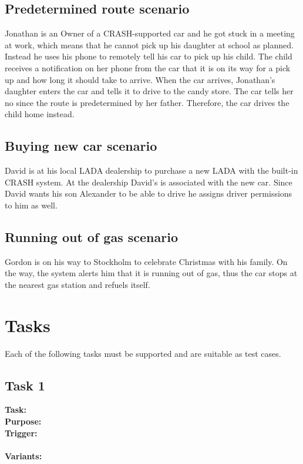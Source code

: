 \documentclass{article}
\begin{document}
\subsection {Predetermined route scenario}
Jonathan is an Owner of a CRASH-supported car and he got stuck in a meeting at work, which means that he cannot pick up his daughter at school as planned. Instead he uses his phone to remotely tell his car to pick up his child. The child receives a notification on her phone from the car that it is on its way for a pick up and how long it should take to arrive. When the car arrives, Jonathan’s daughter enters the car and tells it to drive to the candy store. The car tells her no since the route is predetermined by her father. Therefore, the car drives the child home instead.

\subsection {Buying new car scenario}
David is at his local LADA dealership to purchase a new LADA with the built-in CRASH system. At the dealership David’s is associated with the new car. Since David wants his son Alexander to be able to drive he assigns driver permissions to him as well.

\subsection {Running out of gas scenario}
Gordon is on his way to Stockholm to celebrate Christmas with his family. On the way, the system alerts him that it is running out of gas, thus the car stops at the nearest gas station and refuels itself.

\section{Tasks}
Each of the following tasks must be supported and are suitable as test cases.
\subsection {Task 1}
\textbf{Task:} \\
\textbf{Purpose:} \\
\textbf{Trigger:} \\
\\
\noindent
\textbf{Variants:}     \\
\tab{ }  \\
\tab{ }  \\
\tab{ }  \\
\tab{ }   
\medskip
\end{document}
